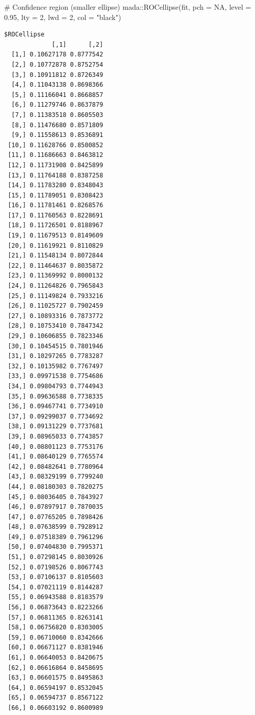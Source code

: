 \documentclass[
  letterpaper,
  DIV=11,
  numbers=noendperiod]{scrartcl}
\newenvironment{Shaded}{\begin{snugshade}}{\end{snugshade}}
\newcommand{\AttributeTok}[1]{\textcolor[rgb]{0.40,0.45,0.13}{#1}}
\newcommand{\CommentTok}[1]{\textcolor[rgb]{0.37,0.37,0.37}{#1}}
\newcommand{\ConstantTok}[1]{\textcolor[rgb]{0.56,0.35,0.01}{#1}}
\newcommand{\DecValTok}[1]{\textcolor[rgb]{0.68,0.00,0.00}{#1}}
\newcommand{\FloatTok}[1]{\textcolor[rgb]{0.68,0.00,0.00}{#1}}
\newcommand{\FunctionTok}[1]{\textcolor[rgb]{0.28,0.35,0.67}{#1}}
\newcommand{\NormalTok}[1]{\textcolor[rgb]{0.00,0.23,0.31}{#1}}
\newcommand{\SpecialCharTok}[1]{\textcolor[rgb]{0.37,0.37,0.37}{#1}}
\newcommand{\StringTok}[1]{\textcolor[rgb]{0.13,0.47,0.30}{#1}}
\begin{document}
\begin{Shaded}
\begin{Highlighting}[]
\CommentTok{\# Confidence region (smaller ellipse)}
\NormalTok{mada}\SpecialCharTok{::}\FunctionTok{ROCellipse}\NormalTok{(fit, }\AttributeTok{pch =} \ConstantTok{NA}\NormalTok{, }\AttributeTok{level =} \FloatTok{0.95}\NormalTok{,}
                 \AttributeTok{lty =} \DecValTok{2}\NormalTok{, }\AttributeTok{lwd =} \DecValTok{2}\NormalTok{, }\AttributeTok{col =} \StringTok{"black"}\NormalTok{)}
\end{Highlighting}
\end{Shaded}

\begin{verbatim}
$ROCellipse
             [,1]      [,2]
  [1,] 0.10627178 0.8777542
  [2,] 0.10772878 0.8752754
  [3,] 0.10911812 0.8726349
  [4,] 0.11043138 0.8698366
  [5,] 0.11166041 0.8668857
  [6,] 0.11279746 0.8637879
  [7,] 0.11383518 0.8605503
  [8,] 0.11476680 0.8571809
  [9,] 0.11558613 0.8536891
 [10,] 0.11628766 0.8500852
 [11,] 0.11686663 0.8463812
 [12,] 0.11731908 0.8425899
 [13,] 0.11764188 0.8387258
 [14,] 0.11783280 0.8348043
 [15,] 0.11789051 0.8308423
 [16,] 0.11781461 0.8268576
 [17,] 0.11760563 0.8228691
 [18,] 0.11726501 0.8188967
 [19,] 0.11679513 0.8149609
 [20,] 0.11619921 0.8110829
 [21,] 0.11548134 0.8072844
 [22,] 0.11464637 0.8035872
 [23,] 0.11369992 0.8000132
 [24,] 0.11264826 0.7965843
 [25,] 0.11149824 0.7933216
 [26,] 0.11025727 0.7902459
 [27,] 0.10893316 0.7873772
 [28,] 0.10753410 0.7847342
 [29,] 0.10606855 0.7823346
 [30,] 0.10454515 0.7801946
 [31,] 0.10297265 0.7783287
 [32,] 0.10135982 0.7767497
 [33,] 0.09971538 0.7754686
 [34,] 0.09804793 0.7744943
 [35,] 0.09636588 0.7738335
 [36,] 0.09467741 0.7734910
 [37,] 0.09299037 0.7734692
 [38,] 0.09131229 0.7737681
 [39,] 0.08965033 0.7743857
 [40,] 0.08801123 0.7753176
 [41,] 0.08640129 0.7765574
 [42,] 0.08482641 0.7780964
 [43,] 0.08329199 0.7799240
 [44,] 0.08180303 0.7820275
 [45,] 0.08036405 0.7843927
 [46,] 0.07897917 0.7870035
 [47,] 0.07765205 0.7898426
 [48,] 0.07638599 0.7928912
 [49,] 0.07518389 0.7961296
 [50,] 0.07404830 0.7995371
 [51,] 0.07298145 0.8030926
 [52,] 0.07198526 0.8067743
 [53,] 0.07106137 0.8105603
 [54,] 0.07021119 0.8144287
 [55,] 0.06943588 0.8183579
 [56,] 0.06873643 0.8223266
 [57,] 0.06811365 0.8263141
 [58,] 0.06756820 0.8303005
 [59,] 0.06710060 0.8342666
 [60,] 0.06671127 0.8381946
 [61,] 0.06640053 0.8420675
 [62,] 0.06616864 0.8458695
 [63,] 0.06601575 0.8495863
 [64,] 0.06594197 0.8532045
 [65,] 0.06594737 0.8567122
 [66,] 0.06603192 0.8600989

\end{verbatim}
\end{document}
